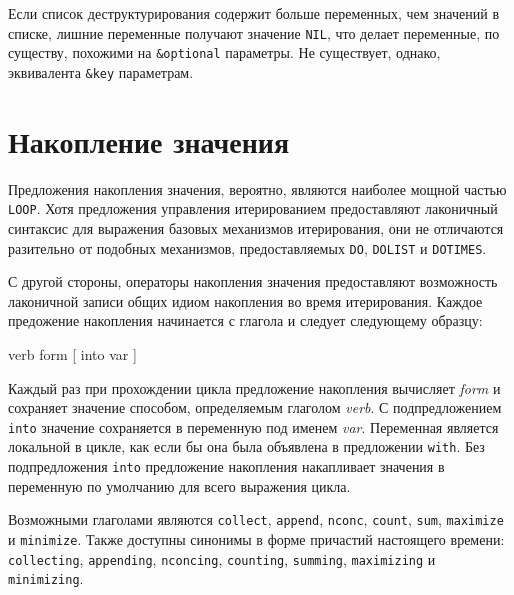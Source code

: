 Если список деструктурирования содержит больше переменных, чем значений в списке, лишние
переменные получают значение \lstinline{NIL}, что делает переменные, по существу, похожими на
\lstinline!&optional! параметры. Не существует, однако, эквивалента \lstinline!&key!
параметрам.

\section{Накопление значения}

Предложения накопления значения, вероятно, являются наиболее мощной частью
\lstinline{LOOP}. Хотя предложения управления итерированием предоставляют лаконичный
синтаксис для выражения базовых механизмов итерирования, они не отличаются разительно от
подобных механизмов, предоставляемых \lstinline{DO}, \lstinline{DOLIST} и \lstinline{DOTIMES}.

С другой стороны, операторы накопления значения предоставляют возможность лаконичной
записи общих идиом накопления во время итерирования. Каждое предожение накопления
начинается с глагола и следует следующему образцу:

\begin{myverb}
verb form [ into var ]
\end{myverb}

Каждый раз при прохождении цикла предложение накопления вычисляет \textit{form} и
сохраняет значение способом, определяемым глаголом \textit{verb}. С подпредложением
\lstinline{into} значение сохраняется в переменную под именем \textit{var}. Переменная является
локальной в цикле, как если бы она была объявлена в предложении \lstinline{with}. Без
подпредложения \lstinline{into} предложение накопления накапливает значения в переменную по
умолчанию для всего выражения цикла.

Возможными глаголами являются \lstinline{collect}, \lstinline{append}, \lstinline{nconc}, \lstinline{count},
\lstinline{sum}, \lstinline{maximize} и \lstinline{minimize}. Также доступны синонимы в форме причастий
настоящего времени: \lstinline{collecting}, \lstinline{appending}, \lstinline{nconcing}, \lstinline{counting},
\lstinline{summing}, \lstinline{maximizing} и \lstinline{minimizing}.

